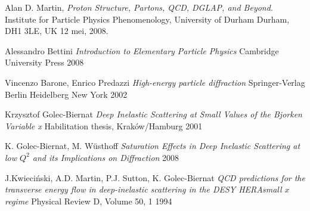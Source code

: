 \documentclass[a4paper,11pt]{article}
\numberwithin{equation}{section} %
\begin{document}
\newpage
\begin{thebibliography}{99}

  Alan D. Martin,
  \emph{Proton Structure, Partons, QCD, DGLAP, and Beyond}.
  Institute for Particle Physics Phenomenology,
  University of Durham
  Durham, DH1 3LE, UK
  12 mei, 2008.

  Alessandro Bettini
  \emph{Introduction to Elementary Particle Physics}
  Cambridge University Press
  2008

  Vincenzo Barone, Enrico Predazzi
  \emph{High-energy particle diffraction}
  Springer-Verlag Berlin Heidelberg New York
  2002

  Krzysztof Golec-Biernat
  \emph{Deep Inelastic Scattering at Small Values of the Bjorken Variable x}
  Habilitation thesis,
  Kraków/Hamburg
  2001

  K. Golec-Biernat, M. Wüsthoff
 \emph{ Saturation Effects in Deep Inelastic Scattering at low $Q^2$ and its Implications on Diffraction}
  2008
  
  J.Kwieciński, A.D. Martin, P.J. Sutton, K. Golec-Biernat
  \emph{QCD predictions for the transverse energy flow in deep-inelastic scattering in the DESY HERAsmall $x$ regime}
  Physical Review D, Volume 50, 1
  1994

\end{thebibliography}
\end{document}
